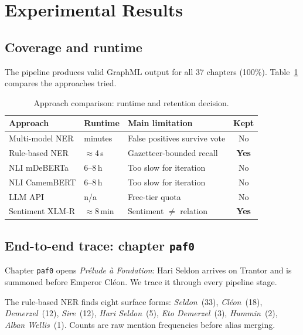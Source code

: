 \documentclass[a4paper]{article}
\begin{document}
\section{Experimental Results}

\subsection{Coverage and runtime}

The pipeline produces valid GraphML output for all 37 chapters (100\%).
Table~\ref{tab:comparison} compares the approaches tried.

\begin{table}[h]
\centering
\caption{Approach comparison: runtime and retention decision.}
\label{tab:comparison}
\setlength{\tabcolsep}{3pt}
\small
\begin{tabular}{p{2.5cm}p{1.4cm}p{2.4cm}c}
\toprule
\textbf{Approach} & \textbf{Runtime} & \textbf{Main limitation} & \textbf{Kept} \\
\midrule
Multi-model NER & minutes & False positives survive vote & No \\
Rule-based NER  & $\approx$4\,s   & Gazetteer-bounded recall     & \textbf{Yes} \\
\midrule
NLI mDeBERTa    & 6--8\,h  & Too slow for iteration & No \\
NLI CamemBERT   & 6--8\,h  & Too slow for iteration & No \\
LLM API         & n/a      & Free-tier quota        & No \\
Sentiment XLM-R & $\approx$8\,min & Sentiment $\neq$ relation  & \textbf{Yes} \\
\bottomrule
\end{tabular}
\end{table}

\subsection{End-to-end trace: chapter \texttt{paf0}}

Chapter \texttt{paf0} opens \textit{Prélude à Fondation}: Hari
Seldon arrives on Trantor and is summoned before Emperor Cléon.
We trace it through every pipeline stage.

The rule-based NER finds eight surface forms: \textit{Seldon}~(33),
\textit{Cléon}~(18), \textit{Demerzel}~(12), \textit{Sire}~(12),
\textit{Hari Seldon}~(5), \textit{Eto Demerzel}~(3),
\textit{Hummin}~(2), \textit{Alban Wellis}~(1). Counts are raw
mention frequencies before alias merging.
\end{document}
